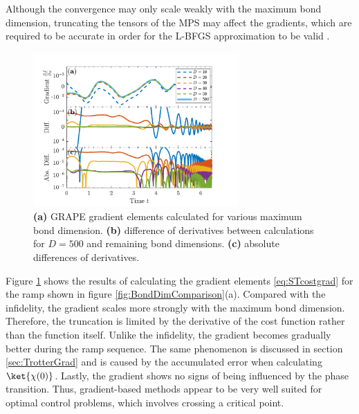 Although the convergence may only scale weakly with the maximum bond dimension, truncating the tensors of the MPS may affect the gradients, which are required to be accurate in order for the L-BFGS approximation to be valid \cite{deFouquieres2011}. 
\begin{figure}[h!]
    \centering
    \includegraphics[width=0.7\textwidth]{Figures/BondDim/GradientBondComparison.pdf}
    \caption{\textbf{(a)} GRAPE gradient elements calculated for various maximum bond dimension. \textbf{(b)} difference of derivatives between calculations for $D = 500$ and remaining bond dimensions. \textbf{(c)} absolute differences of derivatives.}
    \label{fig:GradientBondDim}
\end{figure}
Figure \ref{fig:GradientBondDim} shows the results of calculating the gradient elements \ref{eq:STcostgrad} for the ramp shown in figure \ref{fig:BondDimComparison}(a). Compared with the infidelity, the gradient scales more strongly with the maximum bond dimension. Therefore, the truncation is limited by the derivative of the cost function rather than the function itself. Unlike the infidelity, the gradient becomes gradually better during the ramp sequence. The same phenomenon is discussed in section \ref{sec:TrotterGrad} and is caused by the accumulated error when calculating $\ket{\chi (0)}$. Lastly, the gradient shows no signs of being influenced by the phase transition. Thus, gradient-based methods appear to be very well suited for optimal control problems, which involves crossing a critical point.